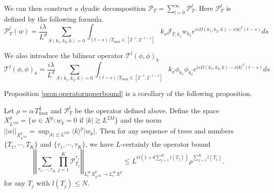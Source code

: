 We can then construct a dyadic decomposition  $\mathcal{P}_{T}=\sum_{l=0}^{\infty} \mathcal{P}^l_{T}$. Here $\mathcal{P}_T^l$ is defined by the following formula. 
\begin{equation}
\mathcal{P}_T^l(w)=\frac{i\lambda}{L^{d}} \sum\limits_{S(k_1,k_2,k)=0}\int_{(t-s)/T_{\text{max}}\in [2^{-\tau},2^{-\tau-1}]}k_{x}\mathcal{J}_{T,k_1} w_{k_2}e^{i s\Omega(k_1,k_2,k)- \nu|k|^2(t-s)} ds
\end{equation}

We also introduce the bilinear operator $\mathcal{T}^l(\phi,\phi)_k$
\begin{equation}
\mathcal{T}^l(\phi,\phi)_k=\frac{i\lambda}{L^{d}} \sum\limits_{S(k_1,k_2,k)=0}\int_{(t-s)/T_{\text{max}}\in [2^{-\tau},2^{-\tau-1}]}k_{x}\phi_{k_1} \phi_{k_2}e^{i s\Omega(k_1,k_2,k)- \nu|k|^2(t-s)} ds
\end{equation}


Proposition \ref{prop.operatorupperbound} is a corollary of the following proposition.

\begin{prop}\label{prop.operatorupperbound'}
Let $\rho=\alpha\, T^{\frac{1}{2}}_{\text{max}}$ and $\mathcal{P}^l_{T}$ be the operator defined above. Define the space $X^{p}_{L^{2M}}=\{w\in X^p: w_k=0\text{ if }|k|\gtrsim L^{2M}\}$ and the norm $||w||_{X^{p}_{L^{2M}}}=\sup_{|k|\lesssim L^{2M}} \langle k\rangle^{p} |w_k|$. Then for any sequence of trees and numbers $\{T_1,\cdots,T_K\}$ and $\{\tau_1,\cdots,\tau_K\}$, we have $L$-certainly the operator bound
\begin{equation}\label{eq.operatornormtau.threewave}
    \left|\left|\sum_{\tau_1,\cdots,\tau_K}\prod_{j=1}^K\mathcal{P}^{\tau_j}_{T_j}\right|\right|_{L_t^{\infty}X^{p}_{L^{2M}}\rightarrow L_t^{\infty}X^{p}}\le L^{O\left(1+\theta \sum_{j=1}^K l(T_j)\right)} \rho^{\sum_{j=1}^K l(T_j)}.
\end{equation}
for any $T_j$ with $l(T_j)\le N$. 
\end{prop}

